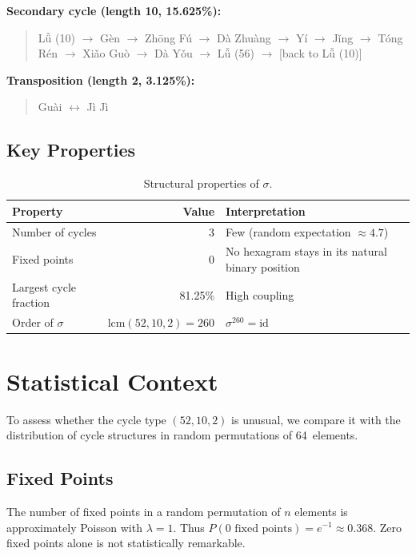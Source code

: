 \documentclass[11pt,a4paper]{article}
\begin{document}
\noindent\textbf{Secondary cycle (length 10, 15.625\%):}
\begin{quote}\small
Lǚ (10) $\to$ Gèn $\to$ Zhōng Fú $\to$ Dà Zhuàng $\to$ Yí $\to$ Jǐng $\to$ Tóng Rén $\to$ Xiǎo Guò $\to$ Dà Yǒu $\to$ Lǚ (56) $\to$ [back to Lǚ (10)]
\end{quote}

\noindent\textbf{Transposition (length 2, 3.125\%):}
\begin{quote}\small
Guài $\leftrightarrow$ Jì Jì
\end{quote}

\subsection{Key Properties}

\begin{table}[ht]
\centering
\caption{Structural properties of $\sigma$.}
\label{tab:properties}
\begin{tabular}{@{}lrl@{}}
\toprule
Property & Value & Interpretation \\
\midrule
Number of cycles & 3 & Few (random expectation $\approx 4.7$) \\
Fixed points & 0 & No hexagram stays in its natural binary position \\
Largest cycle fraction & 81.25\% & High coupling \\
Order of $\sigma$ & $\mathrm{lcm}(52,10,2) = 260$ & $\sigma^{260} = \mathrm{id}$ \\
\bottomrule
\end{tabular}
\end{table}


\section{Statistical Context}\label{sec:stats}

To assess whether the cycle type $(52,10,2)$ is unusual, we compare it with the distribution of cycle structures in random permutations of 64~elements.

\subsection{Fixed Points}

The number of fixed points in a random permutation of $n$ elements is approximately Poisson with $\lambda = 1$.
Thus $P(\text{0 fixed points}) = e^{-1} \approx 0.368$.
Zero fixed points alone is not statistically remarkable.
\end{document}
